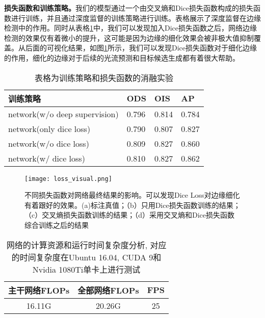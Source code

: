 \documentclass[master]{thesis-uestc}
\begin{document}
\textbf{损失函数和训练策略。}我们的模型通过一个由交叉熵和Dice损失函数构成的损失函数进行训练，并且通过深度监督的训练策略进行训练。表格展示了深度监督在边缘检测中的作用。同时从表格\ref{tab:loss}中，我们可以发现加入Dice损失函数之后，网络边缘检测的效果仅有着微小的提升，这可能是因为边缘的细化效果会被非极大值抑制覆盖。从后面的可视化结果，如图\ref{fig:loss}所示，我们可以发现Dice损失函数对于细化边缘的作用，细化的边缘对于后续的光流预测和目标候选生成都有着很大帮助。
\begin{table}
    \centering
    \caption{表格为训练策略和损失函数的消融实验}
    \begin{tabular}{l|lll}
    \hline
    训练策略 & ODS & OIS & AP \\
    \hline
    \hline
    network(w/o deep supervision) & 0.796  & 0.814 & 0.784     \\
    network(only dice loss) & 0.790  & 0.807 & 0.827     \\
    network(w/o dice loss)     & 0.809  & 0.827 & 0.860     \\
    network(w/ dice loss)       & 0.810  & 0.827 & 0.862      \\
    \hline
    \end{tabular}
    \label{tab:loss}
\end{table}


\begin{figure}[h!]
    \texttt{[image: loss\_visual.png]}
    \caption{不同损失函数对网络最终结果的影响。可以发现Dice Loss对边缘细化有着跟好的效果。(a)标注真值；（b）只用Dice损失函数训练的结果；（c）交叉熵损失函数训练的结果；（d）采用交叉熵和Dice损失函数综合训练之后的结果}
    \label{fig:loss}
\end{figure}

\begin{table}[h!]
    \begin{center}
        \caption{网络的计算资源和运行时间复杂度分析, 对应的时间复杂度在Ubuntu 16.04, CUDA 9和Nvidia 1080Ti单卡上进行测试}
        \label{tab:cost2}
        \begin{tabular}{c|c|c}
            \toprule %
            \textbf{主干网络FLOPs} & \textbf{全部网络FLOPs} & \textbf{FPS}\\
            \midrule %
            16.11G&20.26G&25\\    
            \bottomrule %
        \end{tabular}
    \end{center}
\end{table}
\end{document}
